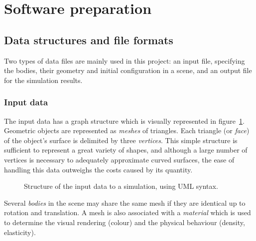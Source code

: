 \section{Software preparation\label{softwarePreparation}}

\subsection{Data structures and file formats}
Two types of data files are mainly used in this project: an input file, specifying the bodies,
their geometry and initial configuration in a scene, and an output file for the simulation
results.

\subsubsection{Input data}
The input data has a graph structure which is visually represented in figure~\ref{sceneSchema}.
Geometric objects are represented as \emph{meshes} of triangles. Each triangle (or \emph{face})
of the object's surface is delimited by three \emph{vertices}. This simple structure is sufficient
to represent a great variety of shapes, and although a large number of vertices is necessary to
adequately approximate curved surfaces, the ease of handling this data outweighs the costs caused
by its quantity.

\begin{figure}
\centerline{}
\caption{Structure of the input data to a simulation, using UML syntax.\label{sceneSchema}}
\end{figure}

Several \emph{bodies} in the scene may share the same mesh if they are identical up to rotation
and translation. A mesh is also associated with a \emph{material} which is used to determine the
visual rendering (colour) and the physical behaviour (density, elasticity).

